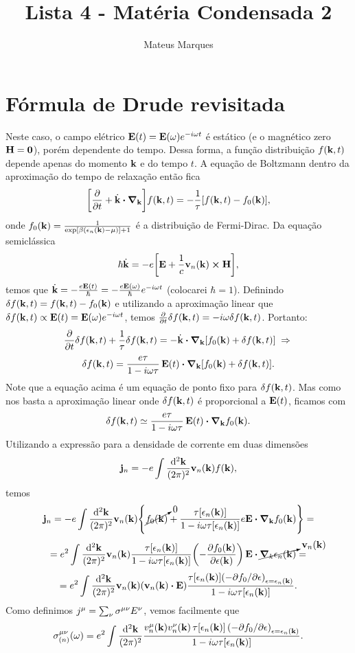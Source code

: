 \documentclass[a4paper,10pt]{article}
\title{\Huge{\textbf{Lista 4 - Matéria Condensada 2}}}
\author{Mateus Marques}
\begin{document}
\maketitle

\section{Fórmula de Drude revisitada}

Neste caso, o campo elétrico $\vb{E}(t) = \vb{E}(\omega) e^{-i\omega t}$ é estático (e o magnético zero $\vb{H}=\vb{0}$), porém dependente do tempo. Dessa forma, a função distribuição $f(\vb{k}, t)$ depende apenas do momento $\vb{k}$ e do tempo $t$. A equação de Boltzmann dentro da aproximação do tempo de relaxação então fica
$$
\qty[\pdv{t} + \dot{\k} \vdot \grad_{\k}] f(\k, t) =
-\frac{1}{\tau} \qty[f(\k,t) - f_0(\k)],
$$
onde $f_0(\vb{k}) = \frac{1}{\exp[\beta(\epsilon_n(\vb{k})-\mu)] + 1}$ é a distribuição de Fermi-Dirac. Da equação semiclássica
$$
\hbar \dot{\k} = -e \qty[\E + \frac{1}{c} \v_n(\k) \cp \vb{H}],
$$
temos que $\dot{\vb{k}} = - \frac{e \vb{E}(t)}{\hbar} = -\frac{e \vb{E}(\omega)}{\hbar} e^{-i\omega t}$ (colocarei $\hbar=1$). Definindo $\delta f(\vb{k},t) = f(\vb{k},t) - f_0(\vb{k})$ e utilizando a aproximação linear que $\delta f(\vb{k},t) \propto \vb{E}(t) = \vb{E}(\omega) e^{-i\omega t}$, temos $\pdv{t} \delta f(\vb{k},t) = - i\omega \delta f(\vb{k},t)$. Portanto:
$$
\pdv{t}\delta f(\k,t) + \frac{1}{\tau} \delta f(\k, t) =  - \dot{\k} \vdot \grad_{\k}  [f_0(\k) + \delta f(\k, t) ] \implies
$$
$$
\delta f(\k,t) = \frac{e \tau}{1-i\omega \tau} \, \E(t) \vdot \grad_{\k}  [ f_0(\k) + \delta f(\k, t) ].
$$
Note que a equação acima é um equação de ponto fixo para $\delta f(\vb{k},t)$. Mas como nos basta a aproximação linear onde $\delta f(\vb{k},t)$ é proporcional a $\vb{E}(t)$, ficamos com
$$
\delta f(\k,t) \simeq \frac{e \tau}{1-i\omega \tau} \, \E(t) \vdot \grad_{\k}  f_0(\k).
$$
Utilizando a expressão para a densidade de corrente em duas dimensões
$$
\vb{j}_n = -e \int \frac{\dd[2]{\vb{k}}}{(2\pi)^2} \vb{v}_n(\vb{k}) f(\vb{k}),
$$
temos
$$
\vb{j}_n = -e \int \frac{\dd[2]{\k}}{(2\pi)^2} \v_n(\k)
\qty{ \cancelto{0}{f_0(\k)} +
\frac{\tau[\eps_n(\k)]}{1-i\omega \tau[\eps_n(\k)]} e\E \vdot \grad_{\k} f_0(\k)} =
$$
$$
= e^2 \int \frac{\dd[2]{\k}}{(2\pi)^2} \v_n(\k)
\frac{\tau[\eps_n(\k)]}{1-i\omega \tau[\eps_n(\k)]} \qty(-\pdv{f_0(\k)}{\eps(\k)}) \, \E \vdot
\cancelto{\v_n(\k)}{\grad_k \eps_n(\k)} =
$$
$$
= e^2 \int \frac{\dd[2]{\k}}{(2\pi)^2} \v_n(\k) ( \v_n(\k) \vdot \E )
\frac{\tau[\eps_n(\k)]\qty(-\partial f_0 / \partial \eps)_{\eps = \eps_n(\k)}}{1-i\omega \tau[\eps_n(\k)]}.
$$
Como definimos $j^{\mu} = \sum_{\nu} \sigma^{\mu\nu} E^{\nu}$, vemos facilmente que
$$
\sigma^{\mu\nu}_{(n)}(\omega) = e^2 \int \frac{\dd[2]{\vb{k}}}{(2\pi)^2}
\frac{v_n^{\mu}(\vb{k}) v_n^{\nu}(\vb{k}) \, \tau[\epsilon_n(\vb{k})] \, \qty(-\partial f_0 / \partial \epsilon)_{\epsilon = \epsilon_n(\vb{k})}}
{1-i\omega \tau[\epsilon_n(\vb{k})]}.
$$
\end{document}
